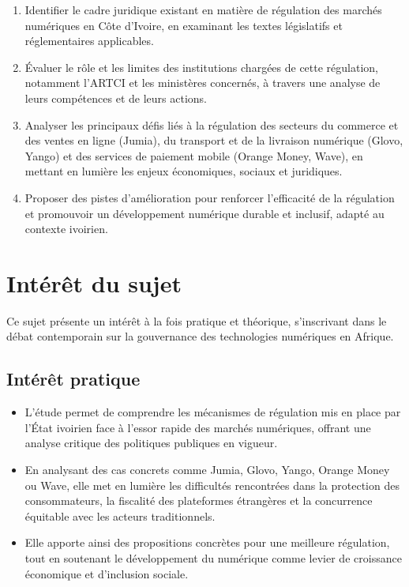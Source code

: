 \begin{enumerate}
\item Identifier le cadre juridique existant en matière de régulation des marchés numériques en Côte d'Ivoire, en examinant les textes législatifs et réglementaires applicables.

\item Évaluer le rôle et les limites des institutions chargées de cette régulation, notamment l'ARTCI et les ministères concernés, à travers une analyse de leurs compétences et de leurs actions.

\item Analyser les principaux défis liés à la régulation des secteurs du commerce et des ventes en ligne (Jumia), du transport et de la livraison numérique (Glovo, Yango) et des services de paiement mobile (Orange Money, Wave), en mettant en lumière les enjeux économiques, sociaux et juridiques.

\item Proposer des pistes d'amélioration pour renforcer l'efficacité de la régulation et promouvoir un développement numérique durable et inclusif, adapté au contexte ivoirien.
\end{enumerate}

\section*{Intérêt du sujet}

Ce sujet présente un intérêt à la fois pratique et théorique, s'inscrivant dans le débat contemporain sur la gouvernance des technologies numériques en Afrique.

\subsection*{Intérêt pratique}

\begin{itemize}
\item L'étude permet de comprendre les mécanismes de régulation mis en place par l'État ivoirien face à l'essor rapide des marchés numériques, offrant une analyse critique des politiques publiques en vigueur.
\item En analysant des cas concrets comme Jumia, Glovo, Yango, Orange Money ou Wave, elle met en lumière les difficultés rencontrées dans la protection des consommateurs, la fiscalité des plateformes étrangères et la concurrence équitable avec les acteurs traditionnels.
\item Elle apporte ainsi des propositions concrètes pour une meilleure régulation, tout en soutenant le développement du numérique comme levier de croissance économique et d'inclusion sociale.
\end{itemize}

